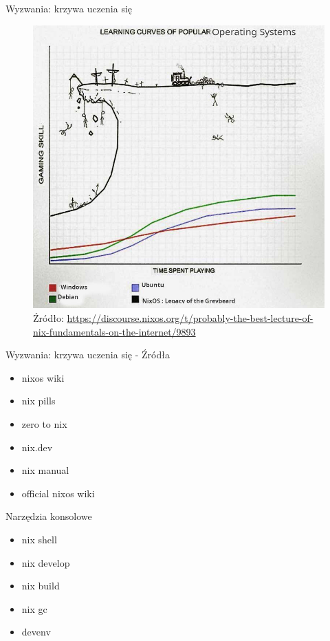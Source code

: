 \documentclass{beamer}
\begin{document}
\begin{frame}{Wyzwania: krzywa uczenia się}
    \begin{figure}
        \includegraphics[width=0.75\linewidth, height=0.75\textheight]{./assets/nixoscurve.jpg}
        \caption*{\scriptsize Źródło: \url{https://discourse.nixos.org/t/probably-the-best-lecture-of-nix-fundamentals-on-the-internet/9893}} %
    \end{figure}
\end{frame}

\begin{frame}{Wyzwania: krzywa uczenia się - Źródła}
    \begin{itemize}
        \item nixos wiki
        \item nix pills
        \item zero to nix
        \item nix.dev
        \item nix manual
        \item official nixos wiki
    \end{itemize}
\end{frame}

\begin{frame}{Narzędzia konsolowe}
    \begin{itemize}
        \item nix shell
        \item nix develop
        \item nix build
        \item nix gc
        \item devenv
    \end{itemize}
\end{frame}
\end{document}
